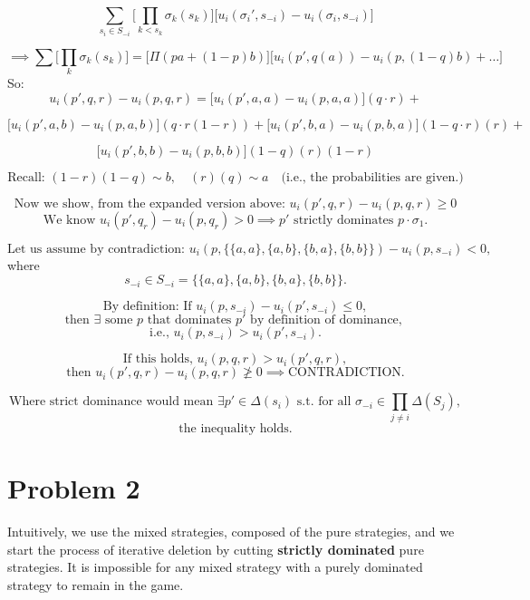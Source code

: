 \documentclass{article}
\begin{document}
\[
\sum_{s_i \in S_{-i}} \Bigg[ \prod_{k < s_k} \sigma_k(s_k) \Bigg] \Big[ u_i(\sigma_i', s_{-i}) - u_i(\sigma_i, s_{-i}) \Big]
\]

\[
\implies \sum \Bigg[ \prod_{k} \sigma_k(s_k) \Bigg] = \Big[ \Pi(pa + (1-p)b) \Big] \Big[ u_i(p', q(a)) - u_i(p, (1-q)b) + \ldots] 
\]
So: 
\[
 u_i(p', q,r) - u_i(p, q,r) = \Big[ u_i(p', a, a) - u_i(p, a, a) \Big](q \cdot r) +
\]

\[
\Big[ u_i(p', a, b) - u_i(p, a, b) \Big](q\cdot r(1-r)) + 
\Big[ u_i(p', b, a) - u_i(p, b, a) \Big](1-q\cdot r)(r) +
\]

\[
\Big[ u_i(p', b, b) - u_i(p, b, b) \Big](1-q)(r)(1-r)
\]

\[
\text{Recall: } (1-r)(1-q) \sim b, \quad (r)(q) \sim a \quad \text{(i.e., the probabilities are given.)}
\]

\[
\text{Now we show, from the expanded version above: } u_i(p', q,r) - u_i(p, q,r) \geq 0
\]
\[
\text{We know } u_i(p', q_r) - u_i(p, q_r) > 0 \implies p' \text{ strictly dominates } p\cdot \sigma_1.
\]

\[
\text{Let us assume by contradiction: } u_i(p, \{ \{a, a\}, \{a, b\}, \{b, a\}, \{b, b\} \}) - u_i(p, s_{-i}) < 0,
\]
where
\[
s_{-i} \in S_{-i} = \{ \{a, a\}, \{a, b\}, \{b, a\}, \{b, b\} \} .
\]

\[
\text{By definition: If } u_i(p, s_{-i}) - u_i(p', s_{-i}) \leq 0,
\]
\[
\text{then } \exists \text{ some } p \text{ that dominates } p' \text{ by definition of dominance, } 
\]
\[
\text{i.e., } u_i(p, s_{-i}) > u_i(p', s_{-i}).
\]

\[
\text{If this holds, } u_i(p, q, r) > u_i(p', q, r),
\]
\[
\text{then } u_i(p', q, r) - u_i(p, q, r) \not\geq 0 \implies \text{CONTRADICTION.}
\]

\[
\text{Where strict dominance would mean } \exists p' \in \Delta(s_i) \text{ s.t. for all } \sigma_{-i} \in \prod_{j \neq i} \Delta(S_j),
\]
\[
\text{the inequality holds.}
\]

\section{Problem 2}
Intuitively, we use the mixed strategies, composed of the pure strategies, and we start the process of iterative deletion by cutting \textbf{strictly dominated} pure strategies. It is impossible for any mixed strategy with a purely dominated strategy to remain in the game.
\end{document}

